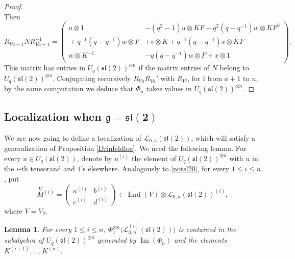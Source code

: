 \documentclass[pdftex]{sigma}%
\numberwithin{equation}{section}
\numberwithin{figure}{section}
\newtheorem{lem}[teo]{Lemma}
\newcommand{\Ll}{{\mathcal L}}
\begin{document}
\begin{proof}
\begin{equation}
\end{equation}
Then
\[
R_{Va+1} N R_{Va+1}^{-1} = \begin{pmatrix} u \otimes 1 & -(q^2-1)u\otimes KF -q^2(q-q^{-1})w\otimes KF^2 \\ {} + q^{-1}(q-q^{-1})w\otimes F & + v \otimes K +q^{-1} (q-q^{-1})x\otimes KF \\[1.5ex] w\otimes K^{-1} & -q(q-q^{-1})w \otimes F + x\otimes 1\end{pmatrix}\!.
\]
This matrix has entries in $U_q({\mathfrak{sl}}(2))^{\otimes n}$ if the matrix entries of $N$ belong to $U_q({\mathfrak{sl}}(2))^{\otimes n}$. Conjugating recursively $R_{Va}R_{Va}'$ with $R_{Vi}$, for $i$ from $a+1$ to $n$, by the same computation we deduce that $\Phi_n$ takes values in $U_q({\mathfrak{sl}}(2))^{\otimes n}$. \end{proof}

\subsection[Localization when g=sl(2)]
{Localization when $\boldsymbol{\mathfrak{g}={\mathfrak{sl}}(2)}$}

We are now going to define a localization of $\Ll_{0,n}({\mathfrak{sl}}(2))$, which will satisfy a generalization of Proposition \ref{Drinfeldloc}. We need the following lemma. For every $u\in U_q({\mathfrak{sl}}(2))$, denote by $u^{(i)}$ the element of $U_q({\mathfrak{sl}}(2))^{\otimes n}$ with $u$ in the $i$-th tensorand and $1$'s elsewhere. Analogously to \eqref{notsl20}, for every $1\leq i \leq n$, put
\begin{equation}\label{notsl2}
\stackrel{V}{M}{}^{\!\! (i)} =\begin{pmatrix} a^{(i)}&b^{(i)}\\c^{(i)}&d^{(i)}\end{pmatrix} \in \operatorname{End}(V)\otimes \Ll_{0,n}({\mathfrak{sl}}(2))^{(i)},
\end{equation}
where $V=V_2$.

{\sloppy\begin{lem}\label{imOK}
For every $1\leq i \leq n$, $\Phi_1^{\otimes n}\big(\Ll_{0,n}^{(i)}({\mathfrak{sl}}(2))\big)$ is contained in the subalgebra of $U_q({\mathfrak{sl}}(2))^{\otimes n}$ generated by $\operatorname{Im}(\Phi_n)$ and the elements $K^{(i+1)},\dots, K^{(n)}$.
\end{lem}}
\end{document}
